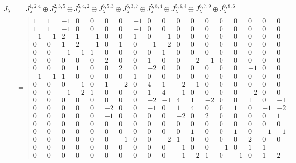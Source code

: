 \documentclass{article}
\begin{document}
\begin{equation}
  \begin{aligned}
    J_{\lambda} & = J^{1,2,4}_{\lambda} \oplus J^{2,3,5}_{\lambda} \oplus J^{5,4,2}_{\lambda} \oplus J^{6,5,3}_{\lambda} \oplus J^{6,3,7}_{\lambda} \oplus J^{5,8,4}_{\lambda} \oplus J^{5,6,8}_{\lambda} \oplus J^{6,7,9}_{\lambda} \oplus J^{9,8,6}_{\lambda} \\
    & = \left[\begin{array}{cccccccccccccccccc}
            1 & 1 & -1 & 0 & 0 & 0 & 0 & -1 & 0 & 0 & 0 & 0 & 0 & 0 & 0 & 0 & 0 & 0 \\
            1 & 1 & -1 & 0 & 0 & 0 & 0 & -1 & 0 & 0 & 0 & 0 & 0 & 0 & 0 & 0 & 0 & 0 \\
            -1 & -1 & 2 & 1 & -1 & 0 & 0 & 1 & 0 & -1 & 0 & 0 & 0 & 0 & 0 & 0 & 0 & 0 \\
            0 & 0 & 1 & 2 & -1 & 0 & 1 & 0 & -1 & -2 & 0 & 0 & 0 & 0 & 0 & 0 & 0 & 0 \\
            0 & 0 & -1 & -1 & 1 & 0 & 0 & 0 & 0 & 1 & 0 & 0 & 0 & 0 & 0 & 0 & 0 & 0 \\
            0 & 0 & 0 & 0 & 0 & 2 & 0 & 0 & 1 & 0 & 0 & -2 & -1 & 0 & 0 & 0 & 0 & 0 \\
            0 & 0 & 0 & 1 & 0 & 0 & 2 & 0 & -2 & 0 & 0 & 0 & 0 & 0 & 0 & -1 & 0 & 0 \\
            -1 & -1 & 1 & 0 & 0 & 0 & 0 & 1 & 0 & 0 & 0 & 0 & 0 & 0 & 0 & 0 & 0 & 0 \\
            0 & 0 & 0 & -1 & 0 & 1 & -2 & 0 & 4 & 1 & -2 & -1 & 0 & 0 & 0 & 0 & 0 & 0 \\
            0 & 0 & -1 & -2 & 1 & 0 & 0 & 0 & 1 & 4 & -1 & 0 & 0 & 0 & 0 & -2 & 0 & 0 \\
            0 & 0 & 0 & 0 & 0 & 0 & 0 & 0 & -2 & -1 & 4 & 1 & -2 & 0 & 0 & 1 & 0 & -1 \\
            0 & 0 & 0 & 0 & 0 & -2 & 0 & 0 & -1 & 0 & 1 & 4 & 0 & 0 & 1 & 0 & -1 & -2 \\
            0 & 0 & 0 & 0 & 0 & -1 & 0 & 0 & 0 & 0 & -2 & 0 & 2 & 0 & 0 & 0 & 0 & 1 \\
            0 & 0 & 0 & 0 & 0 & 0 & 0 & 0 & 0 & 0 & 0 & 0 & 0 & 0 & 0 & 0 & 0 & 0 \\
            0 & 0 & 0 & 0 & 0 & 0 & 0 & 0 & 0 & 0 & 0 & 1 & 0 & 0 & 1 & 0 & -1 & -1 \\
            0 & 0 & 0 & 0 & 0 & 0 & -1 & 0 & 0 & -2 & 1 & 0 & 0 & 0 & 0 & 2 & 0 & 0 \\
            0 & 0 & 0 & 0 & 0 & 0 & 0 & 0 & 0 & 0 & -1 & 0 & 0 & -1 & 0 & 1 & 1 \\
            0 & 0 & 0 & 0 & 0 & 0 & 0 & 0 & 0 & 0 & -1 & -2 & 1 & 0 & -1 & 0 & 1 & 2
      \end{array}\right]\\
  \end{aligned}
\end{equation}
\end{document}
